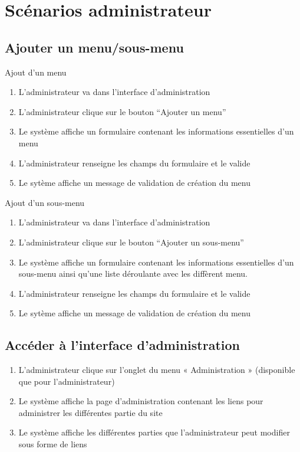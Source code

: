 \documentclass[a4paper,12pt, notitlepage]{report}
\begin{document}
\section{Scénarios administrateur}
\subsection{Ajouter un menu/sous-menu}
Ajout d'un menu
\begin{enumerate}
    \item L’administrateur va dans l’interface d’administration 
    \item L’administrateur clique sur le bouton “Ajouter un menu”
    \item Le système affiche un formulaire contenant les informations essentielles d’un menu
    \item L’administrateur renseigne les champs du formulaire et le valide
    \item Le sytème affiche un message de validation de création du menu
\end{enumerate}

Ajout d'un sous-menu
\begin{enumerate}
    \item L’administrateur va dans l’interface d’administration 
    \item L’administrateur clique sur le bouton “Ajouter un sous-menu”
    \item Le système affiche un formulaire contenant les informations essentielles d’un sous-menu
	    ainsi qu’une liste déroulante avec les diffèrent menu. 
    \item L’administrateur renseigne les champs du formulaire et le valide
    \item Le sytème affiche un message de validation de création du menu
\end{enumerate}
\subsection{Accéder à l'interface d'administration}
\begin{enumerate}
    \item{L'administrateur clique sur l'onglet du menu « Administration » (disponible que pour l'administrateur)}
    \item{Le système affiche la page d'administration contenant les liens pour administrer les différentes partie du site}
    \item{Le système affiche les différentes parties que l'administrateur peut modifier sous forme de liens}
\end{enumerate}
\end{document}
